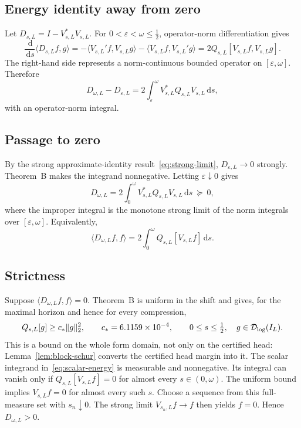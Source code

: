 \documentclass[11pt,a4paper]{article}
\newcommand{\Dlog}{\mathcal D_{\log}}
\newcommand{\dd}{\,\mathrm d}
\newcommand{\eps}{\varepsilon}
\DeclarePairedDelimiter{\norm}{\lVert}{\rVert}
\theoremstyle{plain}
\theoremstyle{definition}
\numberwithin{equation}{section}
\begin{document}
\subsection{Energy identity away from zero}

Let $D_{s,L}=I-V_{s,L}^{*}V_{s,L}$. For $0<\eps<\omega\le\tfrac12$,
operator-norm differentiation gives
\begin{equation}
\frac{\dd}{\dd s}\langle D_{s,L}f,g\rangle
=-\langle V_{s,L}'f,V_{s,L}g\rangle-\langle V_{s,L}f,V_{s,L}'g\rangle
=2Q_{s,L}[V_{s,L}f,V_{s,L}g].
\end{equation}
The right-hand side represents a norm-continuous bounded operator on
$[\eps,\omega]$. Therefore
\begin{equation}
D_{\omega,L}-D_{\eps,L}=2\int_\eps^\omega V_{s,L}^{*}Q_{s,L}V_{s,L}\dd s,
\end{equation}
with an operator-norm integral.

\subsection{Passage to zero}

By the strong approximate-identity result~\eqref{eq:strong-limit},
$D_{\eps,L}\to0$ strongly. Theorem~B makes the integrand nonnegative. Letting
$\eps\downarrow0$ gives
\begin{equation}
D_{\omega,L}=2\int_0^\omega V_{s,L}^{*}Q_{s,L}V_{s,L}\dd s\ \succeq\ 0,
\end{equation}
where the improper integral is the monotone strong limit of the norm integrals
over $[\eps,\omega]$. Equivalently,
\begin{equation}\label{eq:scalar-energy}
\langle D_{\omega,L}f,f\rangle=2\int_0^\omega Q_{s,L}[V_{s,L}f]\dd s .
\end{equation}

\subsection{Strictness}\label{sec:strictness}

Suppose $\langle D_{\omega,L}f,f\rangle=0$. Theorem~B is uniform in the shift
and gives, for the maximal horizon and hence for every compression,
\begin{equation}
Q_{s,L}[g]\ge c_*\norm g_2^2,\qquad c_*=6.1159\times10^{-4},
\qquad0\le s\le\tfrac12,\quad g\in\Dlog(I_L).
\end{equation}
This is a bound on the whole form domain, not only on the certified head:
Lemma~\ref{lem:block-schur} converts the certified head margin into it. The
scalar integrand in~\eqref{eq:scalar-energy} is measurable and nonnegative.
Its integral can vanish only if $Q_{s,L}[V_{s,L}f]=0$ for almost every
$s\in(0,\omega)$. The uniform bound implies $V_{s,L}f=0$ for almost every such
$s$. Choose a sequence from this full-measure set with $s_n\downarrow0$. The
strong limit $V_{s_n,L}f\to f$ then yields $f=0$. Hence $D_{\omega,L}>0$.
\end{document}
